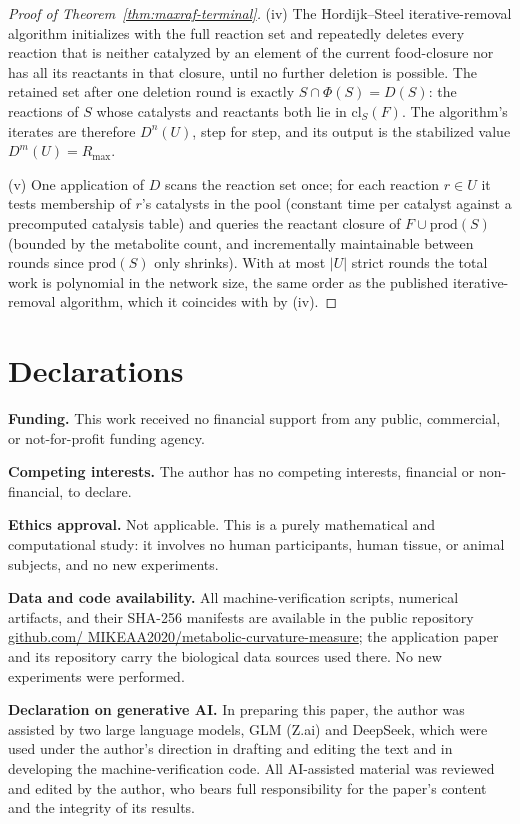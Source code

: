 \documentclass[11pt,a4paper]{article}
\theoremstyle{plain}
\theoremstyle{definition}
\theoremstyle{remark}
\begin{document}
\begin{proof}[Proof of Theorem~\ref{thm:maxraf-terminal}]
(iv) The Hordijk--Steel iterative-removal algorithm initializes
with the full reaction set and repeatedly deletes every reaction
that is neither catalyzed by an element of the current food-closure
nor has all its reactants in that closure, until no further
deletion is possible. The retained set after one deletion round is
exactly $S\cap\Phi(S)=D(S)$: the reactions of $S$ whose catalysts
and reactants both lie in $\mathrm{cl}_{S}(F)$. The algorithm's iterates are therefore
$D^{n}(U)$, step for step, and its output is the stabilized
value $D^{m}(U)=R_{\max}$.

(v) One application of $D$ scans the reaction set once; for each
reaction $r\in U$ it tests membership of $r$'s catalysts in the
pool (constant time per catalyst against a precomputed catalysis
table) and queries the reactant closure of
$F\cup\mathrm{prod}(S)$ (bounded by the metabolite count, and
incrementally maintainable between rounds since
$\mathrm{prod}(S)$ only shrinks). With at most $|U|$ strict
rounds the total work is polynomial in the network size, the same
order as the published iterative-removal algorithm, which it
coincides with by (iv).
\end{proof}

\section*{Declarations}
\noindent\textbf{Funding.} This work received no financial support
from any public, commercial, or not-for-profit funding agency.

\smallskip
\noindent\textbf{Competing interests.} The author has no
competing interests, financial or non-financial, to declare.

\smallskip
\noindent\textbf{Ethics approval.} Not applicable. This is a purely
mathematical and computational study: it involves no human
participants, human tissue, or animal subjects, and no new
experiments.

\smallskip
\noindent\textbf{Data and code availability.} All
machine-verification scripts, numerical artifacts, and their SHA-256
manifests are available in the public repository
\href{https://github.com/MIKEAA2020/metabolic-curvature-measure}{github.com/
MIKEAA2020/metabolic-curvature-measure}; the application paper
\citep{zai2026measure} and its repository carry the biological data
sources used there. No new experiments were performed.

\smallskip
\noindent\textbf{Declaration on generative AI.} In preparing this
paper, the author was assisted by two large language models, GLM
(Z.ai) and DeepSeek, which were used under the author's direction in
drafting and editing the text and in developing the
machine-verification code. All AI-assisted material was reviewed and
edited by the author, who bears full responsibility for the paper's
content and the integrity of its results.
\end{document}
